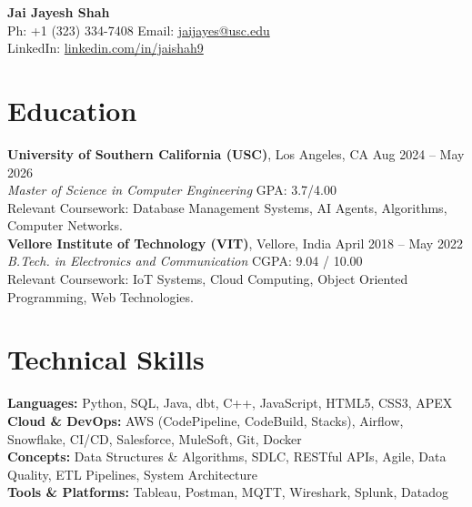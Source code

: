\documentclass[letterpaper,10pt]{article}
\begin{document}
\begin{center}
    {\LARGE \textbf{Jai Jayesh Shah}} \\
    \vspace{4pt}
    \small
    Ph: +1 (323) 334-7408 \quad Email: \href{mailto:jaijayes@usc.edu}{jaijayes@usc.edu} \\
    LinkedIn: \href{https://www.linkedin.com/in/jaishah9}{linkedin.com/in/jaishah9} \\
    \vspace{-10pt}
\end{center}

\section*{Education}
    \textbf{University of Southern California (USC)}, Los Angeles, CA \hfill Aug 2024 -- May 2026 \\
    \textit{Master of Science in Computer Engineering} \hfill GPA: 3.7/4.00 \\
    Relevant Coursework: Database Management Systems, AI Agents, Algorithms, Computer Networks. \\

    \vspace{2pt}
    \textbf{Vellore Institute of Technology (VIT)}, Vellore, India \hfill April 2018 -- May 2022 \\
    \textit{B.Tech. in Electronics and Communication} \hfill CGPA: 9.04 / 10.00 \\
    Relevant Coursework: IoT Systems, Cloud Computing, Object Oriented Programming, Web Technologies.

\section*{Technical Skills}
    \textbf{Languages:} Python, SQL, Java, dbt, C++, JavaScript, HTML5, CSS3, APEX \\
    \textbf{Cloud \& DevOps:} AWS (CodePipeline, CodeBuild, Stacks), Airflow, Snowflake, CI/CD, Salesforce, MuleSoft, Git, Docker \\
    \textbf{Concepts:} Data Structures \& Algorithms, SDLC, RESTful APIs, Agile, Data Quality, ETL Pipelines, System Architecture \\
    \textbf{Tools \& Platforms:} Tableau, Postman, MQTT, Wireshark, Splunk, Datadog

\end{document}
